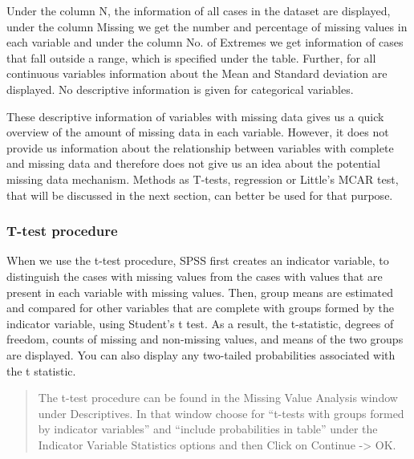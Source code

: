 \documentclass[]{book}
\begin{document}
Under the column N, the information of all cases in the dataset are
displayed, under the column Missing we get the number and percentage of
missing values in each variable and under the column No. of Extremes we
get information of cases that fall outside a range, which is specified
under the table. Further, for all continuous variables information about
the Mean and Standard deviation are displayed. No descriptive
information is given for categorical variables.

These descriptive information of variables with missing data gives us a
quick overview of the amount of missing data in each variable. However,
it does not provide us information about the relationship between
variables with complete and missing data and therefore does not give us
an idea about the potential missing data mechanism. Methods as T-tests,
regression or Little's MCAR test, that will be discussed in the next
section, can better be used for that purpose.

\subsubsection{T-test procedure}\label{t-test-procedure}

When we use the t-test procedure, SPSS first creates an indicator
variable, to distinguish the cases with missing values from the cases
with values that are present in each variable with missing values. Then,
group means are estimated and compared for other variables that are
complete with groups formed by the indicator variable, using Student's t
test. As a result, the t-statistic, degrees of freedom, counts of
missing and non-missing values, and means of the two groups are
displayed. You can also display any two-tailed probabilities associated
with the t statistic.

\begin{quote}
The t-test procedure can be found in the Missing Value Analysis window
under Descriptives. In that window choose for ``t-tests with groups
formed by indicator variables'' and ``include probabilities in table''
under the Indicator Variable Statistics options and then Click on
Continue -\textgreater{} OK.
\end{quote}
\end{document}
